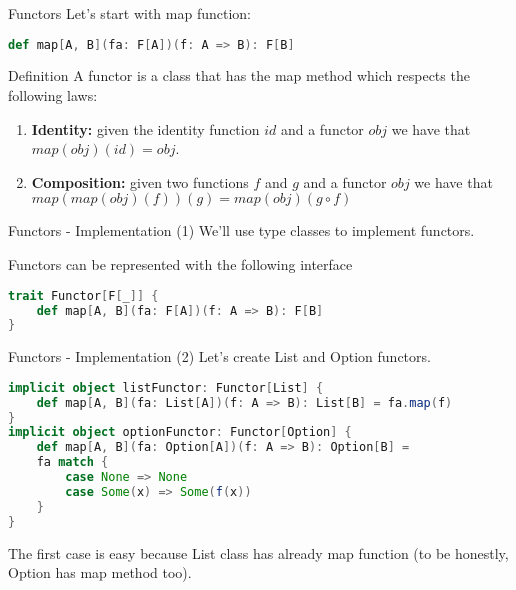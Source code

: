 \begin{frame}[fragile]{Functors}
	Let's start with map function:
\begin{lstlisting}[language=scala]
def map[A, B](fa: F[A])(f: A => B): F[B]
\end{lstlisting}
	\pause
	\begin{block}{Definition}
		A functor is a class that has the map method which respects the following laws:
		\begin{enumerate}[<+->]
			\item \textbf{Identity:} given the identity function $id$ and a functor $obj$ we have that $map(obj)(id) = obj$.
			\item \textbf{Composition:} given two functions $f$ and $g$ and a functor $obj$ we have that $map(map(obj)(f))(g) = map(obj)(g \circ f)$
		\end{enumerate}
	\end{block}	
\end{frame}

\begin{frame}[fragile]{Functors - Implementation (1)}	
	We'll use type classes to implement functors.
	
	Functors can be represented with the following interface
\begin{lstlisting}[language=scala]
trait Functor[F[_]] {
	def map[A, B](fa: F[A])(f: A => B): F[B]
}
\end{lstlisting}
\end{frame}

\begin{frame}[fragile]{Functors - Implementation (2)}			
	Let's create List and Option functors.
\begin{lstlisting}[language=scala]
implicit object listFunctor: Functor[List] {
	def map[A, B](fa: List[A])(f: A => B): List[B] = fa.map(f)
}
implicit object optionFunctor: Functor[Option] {
	def map[A, B](fa: Option[A])(f: A => B): Option[B] = 
	fa match {
		case None => None
		case Some(x) => Some(f(x))	
	}
}			
\end{lstlisting}		
	The first case is easy because List class has already map function
	(to be honestly, Option has map method too).
\end{frame}
	
